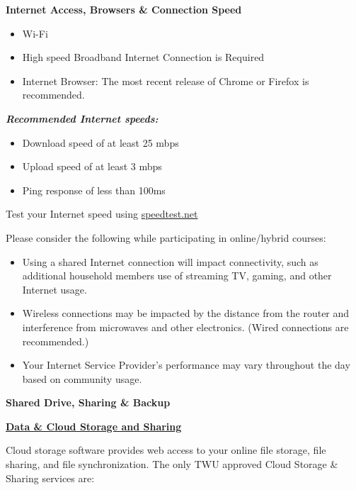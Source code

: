 \documentclass[
]{book}
\providecommand{\tightlist}{%
  \setlength{\itemsep}{0pt}\setlength{\parskip}{0pt}}
\theoremstyle{definition}
\theoremstyle{definition}
\theoremstyle{definition}
\theoremstyle{definition}
\theoremstyle{remark}
\begin{document}
\textbf{Internet Access, Browsers \& Connection Speed}

\begin{itemize}
\tightlist
\item
  Wi-Fi\\
\item
  High speed Broadband Internet Connection is Required\\
\item
  Internet Browser: The most recent release of Chrome or Firefox is recommended.
\end{itemize}

\textbf{\emph{Recommended Internet speeds:}}

\begin{itemize}
\tightlist
\item
  Download speed of at least 25 mbps\\
\item
  Upload speed of at least 3 mbps\\
\item
  Ping response of less than 100ms
\end{itemize}

\begin{feedback}
Test your Internet speed using \url{speedtest.net}
\end{feedback}

Please consider the following while participating in online/hybrid courses:

\begin{itemize}
\tightlist
\item
  Using a shared Internet connection will impact connectivity, such as additional household members use of streaming TV, gaming, and other Internet usage.\\
\item
  Wireless connections may be impacted by the distance from the router and interference from microwaves and other electronics. (Wired connections are recommended.)\\
\item
  Your Internet Service Provider's performance may vary throughout the day based on community usage.
\end{itemize}

\textbf{Shared Drive, Sharing \& Backup}

\textbf{\href{https://trinitywestern.teamdynamix.com/TDClient/1904/Portal/KB/ArticleDet?ID=128533}{Data \& Cloud Storage and Sharing}}

Cloud storage software provides web access to your online file storage, file sharing, and file synchronization. The only TWU approved Cloud Storage \& Sharing services are:
\end{document}
